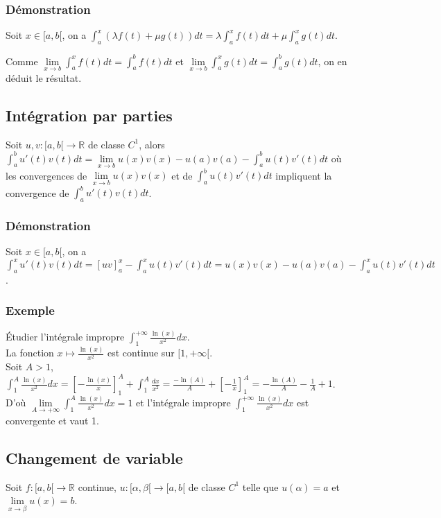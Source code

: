 \documentclass[a4paper,10pt]{book} %
\newcommand{\R}{\mathbb{R}}
\newcommand{\displayAmath}{\displaystyle}
\begin{document}
\subsubsection{Démonstration}
Soit $x\in [a,b[$, on a
$\displayAmath\int_{a}^{x}(\lambda f(t)+\mu g(t))dt=\lambda \int_{a}^{x}f(t)dt+\mu \int_{a}^{x}g(t)dt$.

Comme
$\displayAmath\lim\limits_{x\rightarrow b}\int_{a}^{x}f(t)dt=\int_{a}^{b}f(t)dt$ et 
$\displayAmath\lim\limits_{x\rightarrow b}\int_{a}^{x}g(t)dt=\int_{a}^{b}g(t)dt$, on en déduit le résultat.

\subsection{Intégration par parties}
Soit $u,v : [a,b[\rightarrow\R$ de classe $C^1$, alors $\displayAmath\int_a^bu'(t)v(t)dt=\lim\limits_{x\rightarrow b}u(x)v(x)-u(a)v(a)-\int_a^bu(t)v'(t)dt$
où les convergences de $\displayAmath\lim\limits_{x\rightarrow b}u(x)v(x)$ et de $\displayAmath\int_a^bu(t)v'(t)dt$ impliquent la convergence de $\displayAmath\int_a^bu'(t)v(t)dt$.

\subsubsection{Démonstration}
Soit $x\in [a,b[$, on a $\displayAmath\int_a^xu'(t)v(t)dt=[uv]_a^x-\int_{a}^{x}u(t)v'(t)dt= u(x)v(x)-u(a)v(a)-\int_a^xu(t)v'(t)dt$.

\subsubsection{Exemple}
Étudier l'intégrale impropre $\displayAmath\int_1^{+\infty} \frac{\ln(x)}{x^2}dx$.\\
La fonction $x\mapsto \frac{\ln(x)}{x^2}$ est continue sur $[1,+\infty[$.\\

Soit $A>1$, $\displayAmath\int_1^A\frac{\ln(x)}{x^2}dx=[-\frac{\ln(x)}{x}]_1^A+\int_1^A\frac{dx}{x^2}= \frac{-\ln(A)}{A}+[-\frac{1}{x}]_1^A=-\frac{\ln(A)}{A}-\frac{1}{A}+1$.\\
D'où $\displayAmath\lim\limits_{A\rightarrow +\infty}\int_1^A\frac{\ln(x)}{x^2}dx=1$ et l'intégrale impropre $\displayAmath\int_{1}^{+\infty}\frac{\ln(x)}{x^2}dx$ est convergente et vaut 1.

\subsection{Changement de variable}
Soit $f:[a,b[\rightarrow \R$ continue, $u:[\alpha,\beta[\rightarrow [a,b[$ de classe $C^1$ telle que $u(\alpha)=a$ et $\lim\limits_{x\rightarrow \beta}u(x)=b$.\\
\end{document}
